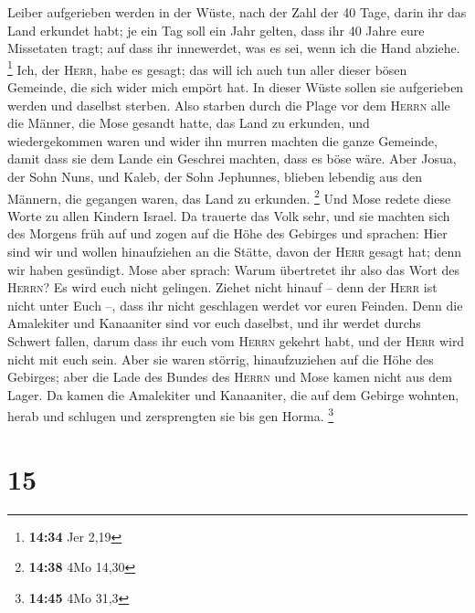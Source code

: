 Leiber aufgerieben werden in der Wüste,  nach der Zahl
der 40 Tage, darin ihr das Land erkundet habt; je ein Tag soll ein Jahr
gelten, dass ihr 40 Jahre eure Missetaten tragt; auf dass ihr
innewerdet, was es sei, wenn ich die Hand abziehe. \footnote{\textbf{14:34}
  Jer 2,19}  Ich, der \textsc{Herr}, habe es gesagt; das
will ich auch tun aller dieser bösen Gemeinde, die sich wider mich
empört hat. In dieser Wüste sollen sie aufgerieben werden und daselbst
sterben.  Also starben durch die Plage vor dem
\textsc{Herrn} alle die Männer, die Mose gesandt hatte, das Land zu
erkunden, und wiedergekommen waren und wider ihn murren machten die
ganze Gemeinde,  damit dass sie dem Lande ein Geschrei
machten, dass es böse wäre.  Aber Josua, der Sohn Nuns,
und Kaleb, der Sohn Jephunnes, blieben lebendig aus den Männern, die
gegangen waren, das Land zu erkunden. \footnote{\textbf{14:38} 4Mo 14,30}
 Und Mose redete diese Worte zu allen Kindern Israel. Da
trauerte das Volk sehr,  und sie machten sich des Morgens
früh auf und zogen auf die Höhe des Gebirges und sprachen: Hier sind wir
und wollen hinaufziehen an die Stätte, davon der \textsc{Herr} gesagt
hat; denn wir haben gesündigt.  Mose aber sprach: Warum
übertretet ihr also das Wort des \textsc{Herrn}? Es wird euch nicht
gelingen.  Ziehet nicht hinauf -- denn der \textsc{Herr}
ist nicht unter Euch --, dass ihr nicht geschlagen werdet vor euren
Feinden.  Denn die Amalekiter und Kanaaniter sind vor
euch daselbst, und ihr werdet durchs Schwert fallen, darum dass ihr euch
vom \textsc{Herrn} gekehrt habt, und der \textsc{Herr} wird nicht mit
euch sein.  Aber sie waren störrig, hinaufzuziehen auf
die Höhe des Gebirges; aber die Lade des Bundes des \textsc{Herrn} und
Mose kamen nicht aus dem Lager.  Da kamen die Amalekiter
und Kanaaniter, die auf dem Gebirge wohnten, herab und schlugen und
zersprengten sie bis gen Horma. \footnote{\textbf{14:45} 4Mo 31,3}

\hypertarget{section-2}{%
\section{15}\label{section-2}}

